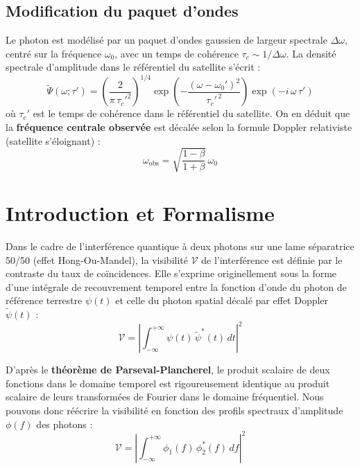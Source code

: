 \documentclass[11pt,a4paper]{article}
\begin{document}
\subsection{Modification du paquet d'ondes}
Le photon est modélisé par un paquet d'ondes gaussien de largeur spectrale $\Delta\omega$,
centré sur la fréquence $\omega_0$, avec un temps de cohérence $\tau_c \sim 1/\Delta\omega$.
La densité spectrale d'amplitude dans le référentiel du satellite s'écrit :
\begin{equation}
    \boxed{\tilde{\Psi}(\omega; \tau') =
    \left(\frac{2}{\pi\,\tau_c'^{2}}\right)^{1/4}
    \exp\!\left(-\frac{(\omega - \omega_0')^2}{\tau_c'^{\,2}}\right)
    \exp\!\left(-i\,\omega\,\tau'\right)}
\end{equation}
où $\tau_c'$ est le temps de cohérence dans le référentiel du satellite.
On en déduit que la \textbf{fréquence centrale observée} est décalée selon la
formule Doppler relativiste (satellite s'éloignant) :
\begin{equation}
    \omega_{\text{obs}} = \sqrt{\frac{1-\beta}{1+\beta}}\,\omega_0
\end{equation}

\section{Introduction et Formalisme}
Dans le cadre de l'interférence quantique à deux photons sur une lame séparatrice 50/50 (effet Hong-Ou-Mandel), la visibilité $\mathcal{V}$ de l'interférence est définie par le contraste du taux de coïncidences. Elle s'exprime originellement sous la forme d'une intégrale de recouvrement temporel entre la fonction d'onde du photon de référence terrestre $\psi(t)$ et celle du photon spatial décalé par effet Doppler $\tilde{\psi}(t)$ :
\begin{equation}
    \mathcal{V} = \left| \int_{-\infty}^{+\infty} \psi(t)\,\tilde{\psi}^*(t) \, dt \right|^2
\end{equation}

D'après le \textbf{théorème de Parseval-Plancherel}, le produit scalaire de deux fonctions dans le domaine temporel est rigoureusement identique au produit scalaire de leurs transformées de Fourier dans le domaine fréquentiel. Nous pouvons donc réécrire la visibilité en fonction des profils spectraux d'amplitude $\phi(f)$ des photons :
\begin{equation}
    \mathcal{V} = \left| \int_{-\infty}^{+\infty} \phi_1(f)\,\phi_2^*(f) \, df \right|^2
\end{equation}
\end{document}

